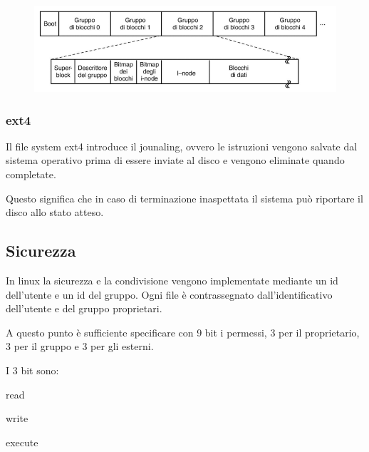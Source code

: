 \begin{figure}[H]
    \centering
    \includegraphics[width=0.5\linewidth]{assets/linux-ext2.png}
\end{figure}

\subsubsection{ext4}
Il file system ext4 introduce il jounaling, ovvero le istruzioni vengono salvate dal sistema operativo prima di essere inviate al disco e vengono eliminate quando completate.

Questo significa che in caso di terminazione inaspettata il sistema può riportare il disco allo stato atteso.

\subsection{Sicurezza}
In linux la sicurezza e la condivisione vengono implementate mediante un id dell'utente e un id del gruppo.
Ogni file è contrassegnato dall'identificativo dell'utente e del gruppo proprietari.

\spacer
A questo punto è sufficiente specificare con 9 bit i permessi, 3 per il proprietario, 3 per il gruppo e 3 per gli esterni.

I 3 bit sono:
\begin{sitemize}
    \item read
    \item write
    \item execute
\end{sitemize}
